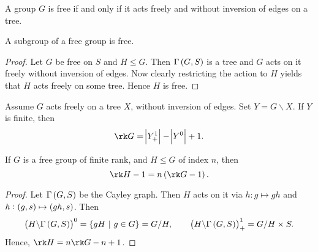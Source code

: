 \begin{theorem}
\label{thm:1.6.19}
A group $ G $ is free if and only if it acts freely and without inversion of edges on a tree.
\end{theorem}

\begin{theorem}
A subgroup of a free group is free.
\end{theorem}

\begin{proof}
Let $ G $ be free on $ S $ and $ H \le G $. Then $ \Gamma\br{G, S} $ is a tree and $ G $ acts on it freely without inversion of edges. Now clearly restricting the action to $ H $ yields that $ H $ acts freely on some tree. Hence $ H $ is free.
\end{proof}

\pagebreak

\begin{exercise}
Assume $ G $ acts freely on a tree $ X $, without inversion of edges. Set $ Y = G \backslash X $. If $ Y $ is finite, then
$$ \rk G = \abs{Y_+^1} - \abs{Y^0} + 1. $$
\end{exercise}

\begin{lemma}
If $ G $ is a free group of finite rank, and $ H \le G $ of index $ n $, then
$$ \rk H - 1 = n\br{\rk G - 1}. $$
\end{lemma}

\begin{proof}
Let $ \Gamma\br{G, S} $ be the Cayley graph. Then $ H $ acts on it via $ h : g \mapsto gh $ and $ h : \br{g, s} \mapsto \br{gh, s} $. Then
$$ \br{H \backslash \Gamma\br{G, S}}^0 = \cbr{gH \st g \in G} = G / H, \qquad \br{H \backslash \Gamma\br{G, S}}_+^1 = G / H \times S. $$
Hence, $ \rk H = n\rk G - n + 1 $.
\end{proof}


